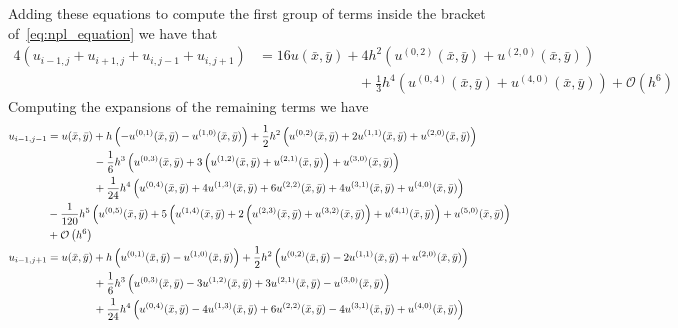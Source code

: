 \documentclass[12pt]{article}
\newcommand{\xbar}{\bar{x}}
\newcommand{\ybar}{\bar{y}}
\newcommand{\bO}{\mathcal{O}}
\begin{document}
Adding these equations to compute the first group of terms inside the bracket of~\eqref{eq:npl_equation} we have that
\begin{align}
	4(u_{i-1,j}+u_{i+1,j}+u_{i,j-1}+u_{i,j+1}) &= 16 u(\xbar,\ybar)
	+4 h^2 \left(u^{(0,2)}(\xbar,\ybar)
	+u^{(2,0)}(\xbar,\ybar)\right)\nonumber\\
	&\hspace{3cm}+\frac{1}{3} h^4\left(u^{(0,4)}(\xbar,\ybar)
	+u^{(4,0)}(\xbar,\ybar)\right)
	+\bO\left(h^6\right)\label{eq:npl_grp1}
\end{align}
Computing the expansions of the remaining terms we have
\begin{subequations}
	\begin{align}
		u_{i-1,j-1} &= u(\xbar,\ybar)+
		h\left(-u^{(0,1)}(\xbar,\ybar)-u^{(1,0)}(\xbar,\ybar)\right)
		+\frac{1}{2}h^2 \left(u^{(0,2)}(\xbar,\ybar)+2		u^{(1,1)}(\xbar,\ybar)+u^{(2,0)}(\xbar,\ybar)\right)\nonumber\\
		&\hspace{1.5cm}-\frac{1}{6} h^3 \left(u^{(0,3)}(\xbar,\ybar) +3\left(u^{(1,2)}(\xbar,\ybar)+u^{(2,1)}(\xbar,\ybar)\right)+u^{(3,0)}(\xbar,\ybar)\right)\nonumber\\
		&\hspace{1.5cm}+\frac{1}{24} h^4
		\left(u^{(0,4)}(\xbar,\ybar)+4 u^{(1,3)}(\xbar,\ybar)+6 u^{(2,2)}(\xbar,\ybar)+4
		u^{(3,1)}(\xbar,\ybar)+u^{(4,0)}(\xbar,\ybar)\right)\nonumber\\
		&-\frac{1}{120} h^5 \left(u^{(0,5)}(\xbar,\ybar)+5
		\left(u^{(1,4)}(\xbar,\ybar)+2
		\left(u^{(2,3)}(\xbar,\ybar)+u^{(3,2)}(\xbar,\ybar)\right)+u^{
			(4,1)}(\xbar,\ybar)\right)+u^{(5,0)}(\xbar,\ybar)\right)\nonumber\\
		&+\bO\left(h^6\right)\\
		u_{i-1,j+1} &= u(\xbar,\ybar)
		+h\left(u^{(0,1)}(\xbar,\ybar)-u^{(1,0)}(\xbar,\ybar)\right)
		+\frac{1}{2} h^2 \left(u^{(0,2)}(\xbar,\ybar)-2		u^{(1,1)}(\xbar,\ybar)+u^{(2,0)}(\xbar,\ybar)\right)\nonumber\\
		&\hspace{1.5cm}+\frac{1}{6} h^3 \left(u^{(0,3)}(\xbar,\ybar)-3 u^{(1,2)}(\xbar,\ybar)+3u^{(2,1)}(\xbar,\ybar)-u^{(3,0)}(\xbar,\ybar)\right)\nonumber\\
		&\hspace{1.5cm}+\frac{1}{24} h^4 \left(u^{(0,4)}(\xbar,\ybar)-4 u^{(1,3)}(\xbar,\ybar)+6u^{(2,2)}(\xbar,\ybar)-4 u^{(3,1)}(\xbar,\ybar)+u^{(4,0)}(\xbar,\ybar)\right)\nonumber\\

\end{align}
\end{subequations}
\end{document}
